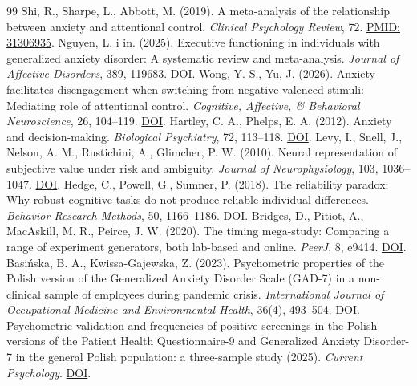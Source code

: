 \documentclass[11pt,a4paper]{article}
\begin{document}
\begin{thebibliography}{99}
 Shi, R., Sharpe, L., Abbott, M. (2019). A meta-analysis of the relationship between anxiety and attentional control. \textit{Clinical Psychology Review}, 72. \href{https://pubmed.ncbi.nlm.nih.gov/31306935/}{PMID: 31306935}.
 Nguyen, L. i in. (2025). Executive functioning in individuals with generalized anxiety disorder: A systematic review and meta-analysis. \textit{Journal of Affective Disorders}, 389, 119683. \href{https://doi.org/10.1016/j.jad.2025.119683}{DOI}.
 Wong, Y.-S., Yu, J. (2026). Anxiety facilitates disengagement when switching from negative-valenced stimuli: Mediating role of attentional control. \textit{Cognitive, Affective, \& Behavioral Neuroscience}, 26, 104--119. \href{https://doi.org/10.3758/s13415-025-01349-2}{DOI}.
 Hartley, C. A., Phelps, E. A. (2012). Anxiety and decision-making. \textit{Biological Psychiatry}, 72, 113--118. \href{https://doi.org/10.1016/j.biopsych.2011.12.027}{DOI}.
 Levy, I., Snell, J., Nelson, A. M., Rustichini, A., Glimcher, P. W. (2010). Neural representation of subjective value under risk and ambiguity. \textit{Journal of Neurophysiology}, 103, 1036--1047. \href{https://doi.org/10.1152/jn.00853.2009}{DOI}.
 Hedge, C., Powell, G., Sumner, P. (2018). The reliability paradox: Why robust cognitive tasks do not produce reliable individual differences. \textit{Behavior Research Methods}, 50, 1166--1186. \href{https://doi.org/10.3758/s13428-017-0935-1}{DOI}.
 Bridges, D., Pitiot, A., MacAskill, M. R., Peirce, J. W. (2020). The timing mega-study: Comparing a range of experiment generators, both lab-based and online. \textit{PeerJ}, 8, e9414. \href{https://doi.org/10.7717/peerj.9414}{DOI}.
 Basińska, B. A., Kwissa-Gajewska, Z. (2023). Psychometric properties of the Polish version of the Generalized Anxiety Disorder Scale (GAD-7) in a non-clinical sample of employees during pandemic crisis. \textit{International Journal of Occupational Medicine and Environmental Health}, 36(4), 493--504. \href{https://doi.org/10.13075/ijomeh.1896.02104}{DOI}.
 Psychometric validation and frequencies of positive screenings in the Polish versions of the Patient Health Questionnaire-9 and Generalized Anxiety Disorder-7 in the general Polish population: a three-sample study (2025). \textit{Current Psychology}. \href{https://doi.org/10.1007/s12144-025-07646-w}{DOI}.
\end{thebibliography}
\end{document}
